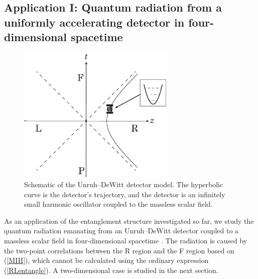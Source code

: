 \documentclass[aps,prd,preprintnumbers,nofootinbib,showpacs]{revtex4}%
\begin{document}
\begin{widetext}
\section{Application I: Quantum radiation from a uniformly accelerating detector in four-dimensional spacetime
\label{Sec:Application1}}
\begin{figure}[t]
\begin{center}
    \includegraphics[width=7.5cm]{fig5.eps}
\caption{Schematic of the Unruh--DeWitt detector model. 
The hyperbolic curve is the detector's trajectory, 
and the detector is an infinitely small harmonic oscillator coupled to the massless scalar field.
\label{fig:conceptualmodel} }
\end{center}
\end{figure}

As an application of the entanglement structure investigated so far, we study the
quantum radiation emanating from 
an Unruh--DeWitt detector coupled to a massless scalar field in four-dimensional spacetime \cite{LH,LH2,IYZ,IYZ2013,IOTYZ,ITUY}. 
The radiation is caused by the two-point correlations between the R region and
the F region based on (\ref{MIII}), which cannot be calculated
using the ordinary expression (\ref{RLentangle}). 
A two-dimensional case is studied in the next section. 


\end{widetext}
\end{document}
